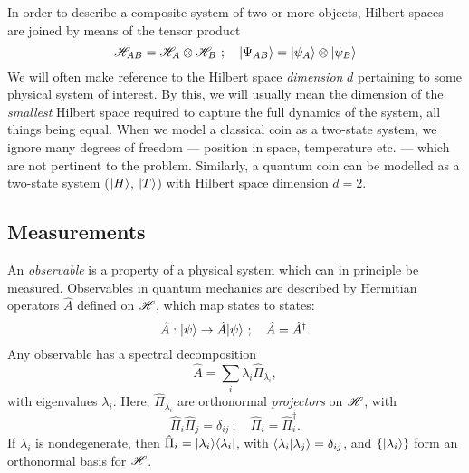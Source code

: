 In order to describe a composite system of two or more objects, Hilbert spaces are joined by means of the tensor product
\begin{equation}
    \mathscr{H}_{AB}  = \mathscr{H}_A \otimes \mathscr{H}_B ~; \quad \mbox{$ | \Psi_{AB} \rangle $} = \mbox{$ | \psi_A \rangle $} \otimes \mbox{$ | \psi_B \rangle $}
\end{equation}
We will often make reference to the Hilbert space \emph{dimension} $d$ pertaining to some physical system of interest. By this, we will usually mean the dimension of the \emph{smallest} Hilbert space required to capture the full dynamics of the system, all things being equal. When we model a classical coin as a two-state system, we ignore many degrees of freedom --- position in space, temperature etc. --- which are not pertinent to the problem. Similarly, a quantum coin can be modelled as a two-state system ($\mbox{$ | H \rangle $}$, $\mbox{$ | T \rangle $}$) with Hilbert space dimension $d=2$.

\subsection{Measurements}
\label{sec:quantum-measurement}
\newcommand{\obs}{\hat{A}}
\newcommand{\projector}{\hat{\Pi}}
An \emph{observable} is a property of a physical system which can in principle be measured.
Observables in quantum mechanics are described by Hermitian operators $\obs$ defined on $\mathscr{H}$, which map states to states:
\begin{equation}
   \obs : \thestate \rightarrow \obs \thestate ~; \quad \obs = \obs^\dagger.
\end{equation}
Any observable has a spectral decomposition
\begin{equation}
   \obs = \sum_i \lambda_i \projector_{\lambda_i},
\end{equation}
with eigenvalues $\lambda_i$. 
Here, $\projector_{\lambda_i}$ are orthonormal \emph{projectors} on $\mathscr{H}$, with 
\begin{equation}
\projector_i \projector_j = \delta_{ij} ~ ; \quad \projector_i= \projector_i^\dagger.
\end{equation}
If $\lambda_i$ is nondegenerate, then 
$\projector_i = \ket{\lambda_i}\bra{\lambda_i}$, with $\langle \lambda_i | \lambda_j \rangle = \delta_{ij}$, and $\{\mbox{$ | \lambda_i \rangle $}\}$ form an orthonormal basis for $\mathscr{H}$.

